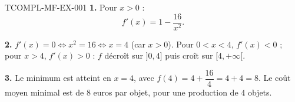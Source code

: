 \begin{corrige}{TCOMPL-MF-EX-001}
\textbf{1.} Pour $x>0$ :
\[
  f'(x) = 1 - \frac{16}{x^2}.
\]

\textbf{2.} $f'(x) = 0 \iff x^2 = 16 \iff x = 4$ (car $x>0$). Pour $0<x<4$, $f'(x)<0$ ; pour $x>4$, $f'(x)>0$ : $f$ décroît sur $]0,4]$ puis croît sur $[4,+\infty[$.

\textbf{3.} Le minimum est atteint en $x=4$, avec $f(4) = 4 + \dfrac{16}{4} = 4+4=8$. Le coût moyen minimal est de $8$ euros par objet, pour une production de $4$ objets.
\end{corrige}
